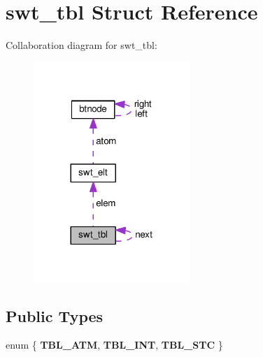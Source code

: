 \hypertarget{structswt__tbl}{}\section{swt\+\_\+tbl Struct Reference}
\label{structswt__tbl}


Collaboration diagram for swt\+\_\+tbl\+:\nopagebreak
\begin{figure}[H]
\begin{center}
\leavevmode
\includegraphics[width=168pt]{structswt__tbl__coll__graph}
\end{center}
\end{figure}
\subsection*{Public Types}
\begin{DoxyCompactItemize}
\item 
enum \{ {\bfseries T\+B\+L\+\_\+\+A\+TM}, 
{\bfseries T\+B\+L\+\_\+\+I\+NT}, 
{\bfseries T\+B\+L\+\_\+\+S\+TC}
 \}\hypertarget{structswt__tbl_a6e6eca39872e41e6d834af855ee073b9}{}\label{structswt__tbl_a6e6eca39872e41e6d834af855ee073b9}

\end{DoxyCompactItemize}
